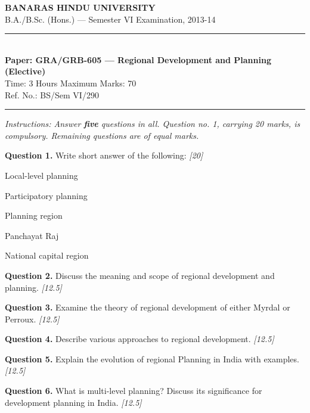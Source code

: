 \documentclass[11pt,a4paper]{article}
\newcommand{\pts}[1]{\hfill   \textit{[#1]}}
\begin{document}
\begin{center}
  {\large\bfseries BANARAS HINDU UNIVERSITY}\\[2pt]
  {\normalsize B.A./B.Sc. (Hons.) --- Semester VI Examination, 2013-14}\\[6pt]
  \rule{0.8\linewidth}{0.5pt}\\[6pt]
  {\large\bfseries Paper: GRA/GRB-605 --- Regional Development and Planning (Elective)}\\[4pt]
  {\normalsize Time: 3 Hours \hfill Maximum Marks: 70}\\[2pt]
  {\small Ref. No.: BS/Sem VI/290}
\end{center}
\rule{\linewidth}{0.4pt}
\smallskip



\noindent   \textit{Instructions: Answer   \textbf{five} questions in all. Question no. 1, carrying 20 marks, is compulsory. Remaining questions are of equal marks.}
\bigskip




\noindent   \textbf{Question 1.} Write short answer of the following: \pts{20}

\begin{parts}
  \item Local-level planning
  \item Participatory planning
  \item Planning region
  \item Panchayat Raj
  \item National capital region
\end{parts}

\medskip


\noindent   \textbf{Question 2.} Discuss the meaning and scope of regional development and planning. \pts{12.5}

\medskip


\noindent   \textbf{Question 3.} Examine the theory of regional development of either Myrdal or Perroux. \pts{12.5}

\medskip


\noindent   \textbf{Question 4.} Describe various approaches to regional development. \pts{12.5}

\medskip


\noindent   \textbf{Question 5.} Explain the evolution of regional Planning in India with examples. \pts{12.5}

\medskip


\noindent   \textbf{Question 6.} What is multi-level planning? Discuss its significance for development planning in India. \pts{12.5}
\end{document}
